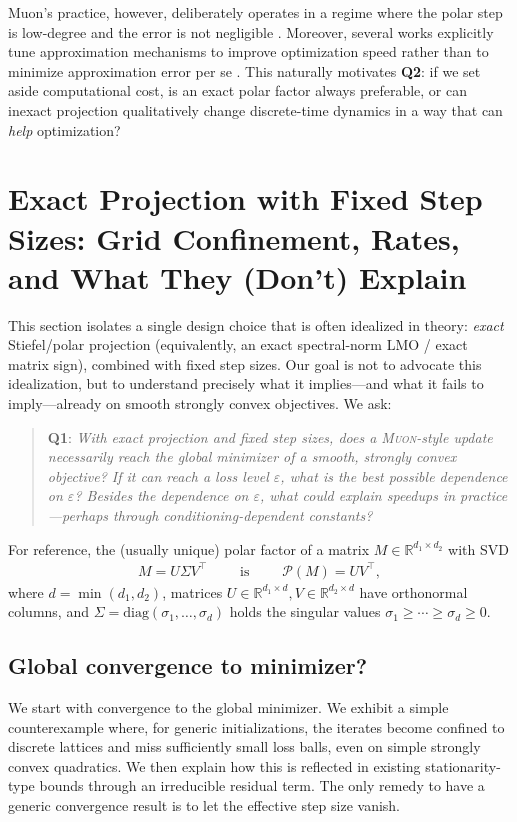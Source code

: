 \documentclass{article}
\theoremstyle{plain}
\theoremstyle{definition}
\theoremstyle{remark}
\newcommand{\proj}{\mathcal{P}}
\newcommand{\Svnn}{{\Sigma}} %
\newcommand{\svnn}{{\sigma}} %
\newcommand{\Muon}{\textsc{Muon}}
\newcommand{\eps}{\varepsilon}
\begin{document}
Muon's practice, however, deliberately operates in a regime where the polar step is low-degree and the error is not negligible \cite{jordan2024muon,liu2025muonscalablellmtraining,shah2025practicalefficiencymuon}.
Moreover, several works explicitly tune approximation mechanisms to improve optimization speed rather than to minimize approximation error per se
\cite{ahn2025dion,khaled2025muonbp,he2025lowrankmuon}.
This naturally motivates \textbf{Q2}: if we set aside computational cost, is an exact polar factor always preferable, or can inexact projection qualitatively change discrete-time dynamics in a way that can \emph{help} optimization?

\section{Exact Projection with Fixed Step Sizes: Grid Confinement, Rates, and What They (Don't) Explain}
\label{sec:setup}

This section isolates a single design choice that is often idealized in theory:
\emph{exact} Stiefel/polar projection (equivalently, an exact spectral-norm LMO / exact matrix sign),
combined with fixed step sizes.
Our goal is not to advocate this idealization, but to understand precisely what it implies---and what it fails to imply---already on smooth strongly convex objectives. 
We ask:

\begin{quote}
\textbf{Q1}: \emph{With exact projection and fixed step sizes, does a \Muon{}-style update necessarily reach the global minimizer of a smooth, strongly convex objective? If it can reach a loss level $\eps$, what is the best possible dependence on $\eps$? Besides 
the dependence on $\eps$, what could explain speedups in practice---perhaps through conditioning-dependent constants?}
\end{quote}

For reference, the (usually unique) polar factor of a matrix $M \in \mathbb{R}^{d_1 \times d_2}$ with SVD
\begin{align}
  M = U \Svnn V^\top \qquad \textrm{ is } \qquad \proj(M) = UV^\top,
  \label{eq:polardef}
\end{align}
where $d = \min(d_1, d_2)$, matrices $U \in \mathbb{R}^{d_1 \times d}, V \in \mathbb{R}^{d_2 \times d}$ have orthonormal columns, and $\Svnn = \mathrm{diag}(\svnn_1, \ldots, \svnn_d)$ holds the singular values $\svnn_1 \geq \cdots \geq \svnn_d \geq 0$.

\subsection{Global convergence to minimizer?}
\label{sec:setup-minimizer}
We start with convergence to the global minimizer.  
We exhibit a simple counterexample where, for generic initializations, the iterates become confined to discrete lattices and miss sufficiently small loss balls, even on simple strongly convex quadratics. 
We then explain how this is reflected in 
existing stationarity-type bounds through an irreducible residual term. 
The only remedy 
to have a generic convergence result 
is to let the effective step size vanish. 
\end{document}
